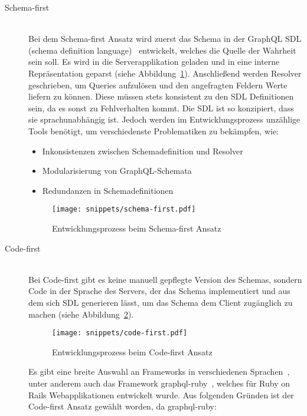 \begin{description}
	\item[Schema-first\label{graphql:schema-first}] \ \\
	Bei dem Schema-first Ansatz wird zuerst das Schema in der GraphQL SDL (schema definition language)~\cite{graphql-sdl} entwickelt, welches die Quelle der Wahrheit sein soll. Es wird in die Serverapplikation geladen und in eine interne Repräsentation geparst (siehe Abbildung~\ref{fig:schema-first}). Anschließend werden Resolver geschrieben, um Queries aufzulösen und den angefragten Feldern Werte liefern zu können. Diese müssen stets konsistent zu den SDL Definitionen sein, da es sonst zu Fehlverhalten kommt. 
	Die SDL ist so konzipiert, dass sie sprachunabhängig ist. Jedoch werden im Entwicklungsprozess unzählige Tools benötigt, um verschiedenste Problematiken zu bekämpfen, wie:
	
	\begin{itemize}
		\setlength\itemsep{-1em}
		\item Inkonsistenzen zwischen Schemadefinition und Resolver
		\item Modularisierung von GraphQL-Schemata
		\item Redundanzen in Schemadefinitionen
	\end{itemize}
	
	\begin{figure}[h!]
		\centering
		\texttt{[image: snippets/schema-first.pdf]}
		\caption{Entwicklungsprozess beim Schema-first Ansatz}
		\label{fig:schema-first}
	\end{figure}

	\item[Code-first\label{graphql:code-first}] \ \\
	Bei Code-first gibt es keine manuell gepflegte Version des Schemas, sondern Code in der Sprache des Servers, der das Schema implementiert und aus dem sich SDL generieren lässt, um das Schema dem Client zugänglich zu machen (siehe Abbildung~\ref{fig:code-first}). 
	
	\begin{figure}[h!]
		\centering
		\texttt{[image: snippets/code-first.pdf]}
		\caption{Entwicklungsprozess beim Code-first Ansatz}
		\label{fig:code-first}
	\end{figure}
	
	
	Es gibt eine breite Auswahl an Frameworks in verschiedenen Sprachen~\cite{code-first-frameworks}, unter anderem auch das Framework graphql-ruby~\cite{graphql-ruby}, welches für Ruby on Rails Webapplikationen entwickelt wurde. 
	Aus folgenden Gründen ist der Code-first Ansatz gewählt worden, da graphql-ruby:


\end{description}
